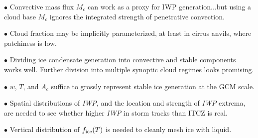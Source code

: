 \item{$\bullet$} Convective mass flux $M_c$ can work as a proxy for
IWP generation...but using a cloud base $M_c$ ignores the integrated
strength of penetrative convection.

\item{$\bullet$} Cloud fraction may be implicitly parameterized, at
least in cirrus anvils, where patchiness is low. 

\item{$\bullet$} Dividing ice condensate generation into convective
and stable components works well. Further division into multiple
synoptic cloud regimes looks promising.

\item{$\bullet$} $w$, $T$, and $A_c$ suffice to grossly represent 
stable ice generation at the GCM scale.

\item{$\bullet$} Spatial distributions of {\it IWP\/}, and the
location and strength of {\it IWP\/} extrema, are needed to see whether
higher {\it IWP\/} in storm tracks than ITCZ is real.

\item{$\bullet$} Vertical distribution of $f_{\rm ice}(T)$ is 
needed to cleanly mesh ice with liquid.

\vfill\eject

\bye
